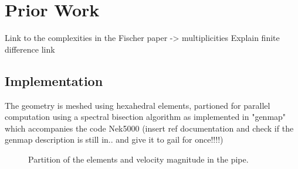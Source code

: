 \documentclass{sig-alternate}
\begin{document}
\section{Prior Work}
Link to the complexities in the Fischer paper -> multiplicities
Explain finite difference link

\subsection{Implementation}
\label{sec:implementation}
The geometry is meshed using hexahedral elements, partioned for parallel computation using a spectral bisection algorithm as implemented in "genmap" which accompanies the code Nek5000 (insert ref documentation and check if the genmap description is still in.. and give it to gail for once!!!!)
\begin{figure}
  \centering
  \caption{Partition of the elements and velocity magnitude in the pipe.}
  \label{fig:partition}
\end{figure}
 
\end{document}
